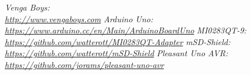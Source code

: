 \begin{thebibliography}{9}
\emph{Venga Boys: \\ \url{http://www.vengaboys.com}}
\emph{Arduino Uno: \\ \url{https://www.arduino.cc/en/Main/ArduinoBoardUno}}
\emph{MI0283QT-9: \\ \url{https://github.com/watterott/MI0283QT-Adapter}}
\emph{mSD-Shield: \\ \url{https://github.com/watterott/mSD-Shield}}
\emph{Pleasant Uno AVR\@: \\ \url{https://github.com/jorams/pleasant-uno-avr}}
\end{thebibliography}
